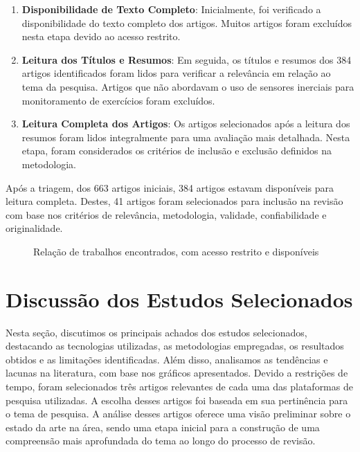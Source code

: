 \documentclass[conference]{IEEEtran}
\begin{document}
\begin{enumerate}
    \item \textbf{Disponibilidade de Texto Completo}: Inicialmente, foi verificado a disponibilidade do texto completo dos artigos. Muitos artigos foram excluídos nesta etapa devido ao acesso restrito.
    
    \item \textbf{Leitura dos Títulos e Resumos}: Em seguida, os títulos e resumos dos 384 artigos identificados foram lidos para verificar a relevância em relação ao tema da pesquisa. Artigos que não abordavam o uso de sensores inerciais para monitoramento de exercícios foram excluídos.
    
    \item \textbf{Leitura Completa dos Artigos}: Os artigos selecionados após a leitura dos resumos foram lidos integralmente para uma avaliação mais detalhada. Nesta etapa, foram considerados os critérios de inclusão e exclusão definidos na metodologia.
\end{enumerate}

Após a triagem, dos 663 artigos iniciais, 384 artigos estavam disponíveis para leitura completa. Destes, 41 artigos foram selecionados para inclusão na revisão com base nos critérios de relevância, metodologia, validade, confiabilidade e originalidade.


\begin{figure}[h!]

    \caption{Relação de trabalhos encontrados, com acesso restrito e disponíveis}
    \label{fig:totalencontrado}
\end{figure}

\newpage

\section{Discussão dos Estudos Selecionados}
\label{sec:discussao}

Nesta seção, discutimos os principais achados dos estudos selecionados, destacando as tecnologias utilizadas, as metodologias empregadas, os resultados obtidos e as limitações identificadas. Além disso, analisamos as tendências e lacunas na literatura, com base nos gráficos apresentados. Devido a restrições de tempo, foram selecionados três artigos relevantes de cada uma das plataformas de pesquisa utilizadas. A escolha desses artigos foi baseada em sua pertinência para o tema de pesquisa. A análise desses artigos oferece uma visão preliminar sobre o estado da arte na área, sendo uma etapa inicial para a construção de uma compreensão mais aprofundada do tema ao longo do processo de revisão.
\end{document}
